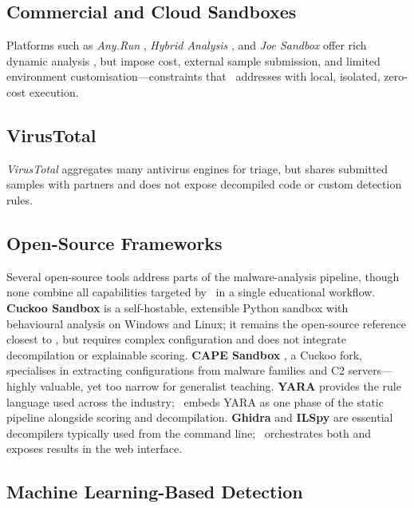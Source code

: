 \subsection{Commercial and Cloud Sandboxes}

Platforms such as \emph{Any.Run} \cite{anyrun2024}, \emph{Hybrid Analysis} \cite{hybrid2019}, and
\emph{Joe Sandbox} \cite{joe2020} offer rich dynamic analysis \cite{bayer2006,willems2007,alrawi2024}, but
impose cost, external sample submission, and limited environment customisation---constraints that
\rat\ addresses with local, isolated, zero-cost execution.

\subsection{VirusTotal}

\emph{VirusTotal} \cite{virustotal2023} aggregates many antivirus engines for triage, but shares
submitted samples with partners and does not expose decompiled code or custom detection rules.

\subsection{Open-Source Frameworks}

Several open-source tools address parts of the malware-analysis pipeline, though none combine all
capabilities targeted by \rat\ in a single educational workflow. \textbf{Cuckoo Sandbox}
\cite{cuckoo2012} is a self-hostable, extensible Python sandbox with behavioural analysis on Windows
and Linux; it remains the open-source reference closest to \rat, but requires complex configuration
and does not integrate decompilation or explainable scoring. \textbf{CAPE Sandbox} \cite{cape2021}, a
Cuckoo fork, specialises in extracting configurations from malware families and C2 servers---highly
valuable, yet too narrow for generalist teaching. \textbf{YARA} \cite{yara2023} provides the rule
language used across the industry; \rat\ embeds YARA as one phase of the static pipeline alongside
scoring and decompilation. \textbf{Ghidra} and \textbf{ILSpy} \cite{ghidra2019,ilspy2024} are
essential decompilers typically used from the command line; \rat\ orchestrates both and exposes
results in the web interface.

\subsection{Machine Learning-Based Detection}

